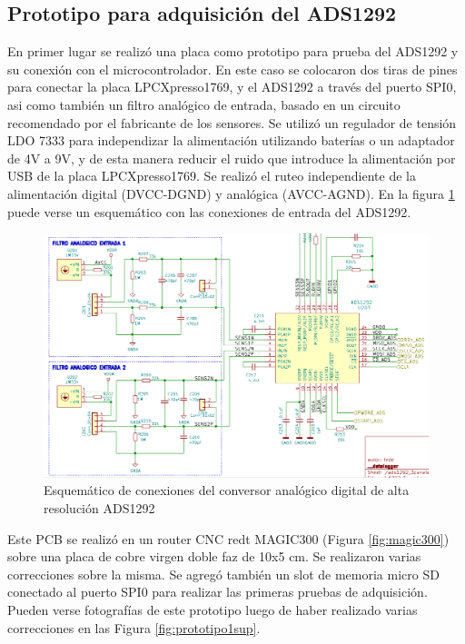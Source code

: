 \subsection{Prototipo para adquisición del ADS1292}

En primer lugar se realizó una placa como prototipo para prueba del ADS1292 y su conexión con el microcontrolador. En este caso se colocaron dos tiras de pines para conectar la placa LPCXpresso1769, y el ADS1292 a través del puerto SPI0, asi como también un filtro analógico de entrada, basado en un circuito recomendado por el fabricante de los sensores. Se utilizó un regulador de tensión LDO 7333 para independizar la alimentación utilizando baterías o un adaptador de 4V a 9V, y de esta manera reducir el ruido que introduce la alimentación por USB de la placa LPCXpresso1769. 
Se realizó el ruteo independiente de la alimentación digital (DVCC-DGND) y analógica (AVCC-AGND). En la figura \ref{fig:ads1292esq} puede verse un esquemático con las conexiones de entrada del ADS1292.

\begin{figure}[!htbp]
	\centering
	
	\begin{minipage}{\textwidth}
		\includegraphics[width=\textwidth]{./Figures/ads1292_esq.png}		
	\end{minipage}		
	
	\caption{Esquemático de conexiones del conversor analógico digital de alta resolución ADS1292}
	\label{fig:ads1292esq}
\end{figure}



Este PCB se realizó en un router CNC redt MAGIC300 (Figura \ref{fig:magic300}) sobre una placa de cobre virgen doble faz de 10x5 cm. Se realizaron varias correcciones sobre la misma. Se agregó también un slot de memoria micro SD conectado al puerto SPI0 para realizar las primeras pruebas de adquisición. Pueden verse fotografías de este prototipo luego de haber realizado varias correcciones en las Figura \ref{fig:prototipo1sup}.

